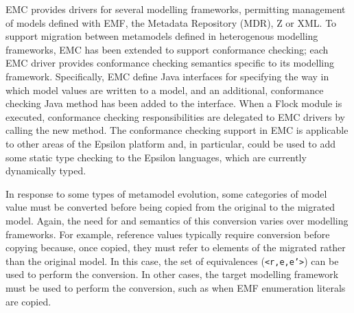 EMC provides drivers for several modelling frameworks, permitting management of models defined with EMF, the Metadata Repository (MDR), Z or XML. To support migration between metamodels defined in heterogenous modelling frameworks, EMC has been extended to support conformance checking; each EMC driver provides conformance checking semantics specific to its modelling framework. Specifically, EMC define Java interfaces for specifying the way in which model values are written to a model, and an additional, conformance checking Java method has been added to the interface. When a Flock module is executed, conformance checking responsibilities are delegated to EMC drivers by calling the new method. The conformance checking support in EMC is applicable to other areas of the Epsilon platform and, in particular, could be used to add some static type checking to the Epsilon languages, which are currently dynamically typed.

In response to some types of metamodel evolution, some categories of model value must be converted before being copied from the original to the migrated model. Again, the need for and semantics of this conversion varies over modelling frameworks. For example, reference values typically require conversion before copying because, once copied, they must refer to elements of the migrated rather than the original model. In this case, the set of equivalences (\texttt{<r,e,e'>}) can be used to perform the conversion. In other cases, the target modelling framework must be used to perform the conversion, such as when EMF enumeration literals are copied.

% 

